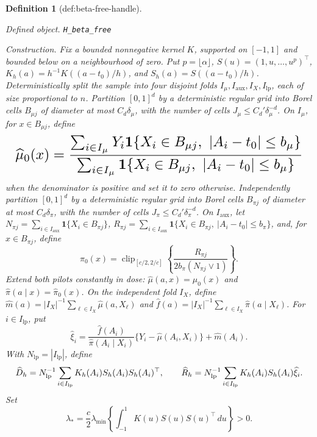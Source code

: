 \documentclass{article}
\newtheorem{definition}{Definition}
\begin{document}
\begin{definition}[def:beta-free-handle]\label{def:beta-free-handle}
\par\smallskip\noindent\emph{Defined object.} \texttt{H\_\allowbreak{}beta\_\allowbreak{}free}
\par\smallskip\noindent\emph{Construction.} Fix a bounded nonnegative kernel \(K\), supported on \([-1,1]\) and bounded below on a neighbourhood of zero. Put \(p=\lfloor\alpha\rfloor\), \(S(u)=(1,u,\ldots,u^p)^\top\), \(K_h(a)=h^{-1}K((a-t_0)/h)\), and \(S_h(a)=S((a-t_0)/h)\). Deterministically split the sample into four disjoint folds \(I_\mu,I_{\mathrm{aux}},I_X,I_{\mathrm{lp}}\), each of size proportional to \(n\). Partition \([0,1]^d\) by a deterministic regular grid into Borel cells \(B_{\mu j}\) of diameter at most \(C_d\delta_\mu\), with the number of cells \(J_\mu\le C_d'\delta_\mu^{-d}\). On \(I_\mu\), for \(x\in B_{\mu j}\), define
\[
\makebox[\linewidth][c]{\resizebox{0.98\linewidth}{!}{\(\displaystyle \widehat\mu_0(x)=
\frac{\sum_{i\in I_\mu}Y_i\mathbf 1\{X_i\in B_{\mu j},\ |A_i-t_0|\le b_\mu\}}
{\sum_{i\in I_\mu}\mathbf 1\{X_i\in B_{\mu j},\ |A_i-t_0|\le b_\mu\}}\)}}
\]
when the denominator is positive and set it to zero otherwise. Independently partition \([0,1]^d\) by a deterministic regular grid into Borel cells \(B_{\pi j}\) of diameter at most \(C_d\delta_\pi\), with the number of cells \(J_\pi\le C_d'\delta_\pi^{-d}\). On \(I_{\mathrm{aux}}\), let \(N_{\pi j}=\sum_{i\in I_{\mathrm{aux}}}\mathbf 1\{X_i\in B_{\pi j}\}\), \(R_{\pi j}=\sum_{i\in I_{\mathrm{aux}}}\mathbf 1\{X_i\in B_{\pi j},\ |A_i-t_0|\le b_\pi\}\), and, for \(x\in B_{\pi j}\), define
\[
\widehat\pi_0(x)=\operatorname{clip}_{[c/2,2/c]}\left\{\frac{R_{\pi j}}{2b_\pi(N_{\pi j}\vee1)}\right\}.
\]
Extend both pilots constantly in dose: \(\widehat\mu(a,x)=\widehat\mu_0(x)\) and \(\widehat\pi(a\mid x)=\widehat\pi_0(x)\). On the independent fold \(I_X\), define \(\widehat m(a)=|I_X|^{-1}\sum_{\ell\in I_X}\widehat\mu(a,X_\ell)\) and \(\widehat f(a)=|I_X|^{-1}\sum_{\ell\in I_X}\widehat\pi(a\mid X_\ell)\). For \(i\in I_{\mathrm{lp}}\), put
\[
\widehat\xi_i=\frac{\widehat f(A_i)}{\widehat\pi(A_i\mid X_i)}\{Y_i-\widehat\mu(A_i,X_i)\}+\widehat m(A_i).
\]
With \(N_{\mathrm{lp}}=|I_{\mathrm{lp}}|\), define
\[
\makebox[\linewidth][c]{\resizebox{0.98\linewidth}{!}{\(\displaystyle \widehat D_h=N_{\mathrm{lp}}^{-1}\sum_{i\in I_{\mathrm{lp}}}K_h(A_i)S_h(A_i)S_h(A_i)^\top,
\qquad
\widehat R_h=N_{\mathrm{lp}}^{-1}\sum_{i\in I_{\mathrm{lp}}}K_h(A_i)S_h(A_i)\widehat\xi_i.\)}}
\]
Set
\[
\lambda_*=\frac c2\lambda_{\min}\left\{\int_{-1}^1K(u)S(u)S(u)^\top\,du\right\}>0.
\]
\end{definition}
\end{document}
